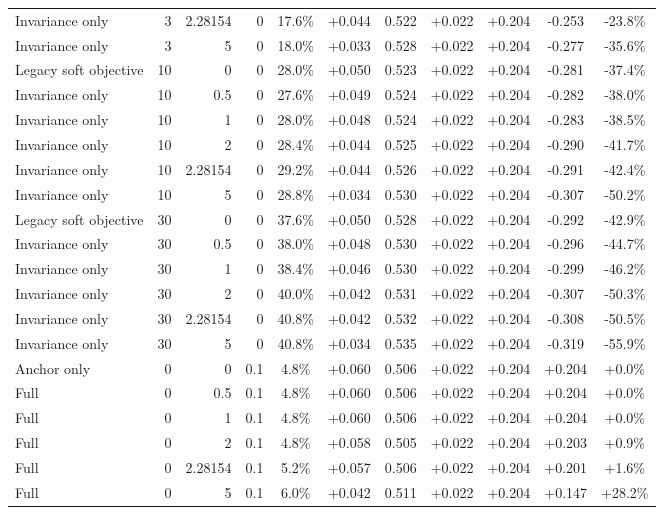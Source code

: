 \begin{table}[htbp]
\begin{tabular}{lrrrccccccc}
Invariance only & 3 & 2.28154 & 0 & 17.6\% & +0.044 & 0.522 & +0.022 & +0.204 & -0.253 & -23.8\% \\
Invariance only & 3 & 5 & 0 & 18.0\% & +0.033 & 0.528 & +0.022 & +0.204 & -0.277 & -35.6\% \\
Legacy soft objective & 10 & 0 & 0 & 28.0\% & +0.050 & 0.523 & +0.022 & +0.204 & -0.281 & -37.4\% \\
Invariance only & 10 & 0.5 & 0 & 27.6\% & +0.049 & 0.524 & +0.022 & +0.204 & -0.282 & -38.0\% \\
Invariance only & 10 & 1 & 0 & 28.0\% & +0.048 & 0.524 & +0.022 & +0.204 & -0.283 & -38.5\% \\
Invariance only & 10 & 2 & 0 & 28.4\% & +0.044 & 0.525 & +0.022 & +0.204 & -0.290 & -41.7\% \\
Invariance only & 10 & 2.28154 & 0 & 29.2\% & +0.044 & 0.526 & +0.022 & +0.204 & -0.291 & -42.4\% \\
Invariance only & 10 & 5 & 0 & 28.8\% & +0.034 & 0.530 & +0.022 & +0.204 & -0.307 & -50.2\% \\
Legacy soft objective & 30 & 0 & 0 & 37.6\% & +0.050 & 0.528 & +0.022 & +0.204 & -0.292 & -42.9\% \\
Invariance only & 30 & 0.5 & 0 & 38.0\% & +0.048 & 0.530 & +0.022 & +0.204 & -0.296 & -44.7\% \\
Invariance only & 30 & 1 & 0 & 38.4\% & +0.046 & 0.530 & +0.022 & +0.204 & -0.299 & -46.2\% \\
Invariance only & 30 & 2 & 0 & 40.0\% & +0.042 & 0.531 & +0.022 & +0.204 & -0.307 & -50.3\% \\
Invariance only & 30 & 2.28154 & 0 & 40.8\% & +0.042 & 0.532 & +0.022 & +0.204 & -0.308 & -50.5\% \\
Invariance only & 30 & 5 & 0 & 40.8\% & +0.034 & 0.535 & +0.022 & +0.204 & -0.319 & -55.9\% \\
Anchor only & 0 & 0 & 0.1 & 4.8\% & +0.060 & 0.506 & +0.022 & +0.204 & +0.204 & +0.0\% \\
Full & 0 & 0.5 & 0.1 & 4.8\% & +0.060 & 0.506 & +0.022 & +0.204 & +0.204 & +0.0\% \\
Full & 0 & 1 & 0.1 & 4.8\% & +0.060 & 0.506 & +0.022 & +0.204 & +0.204 & +0.0\% \\
Full & 0 & 2 & 0.1 & 4.8\% & +0.058 & 0.505 & +0.022 & +0.204 & +0.203 & +0.9\% \\
Full & 0 & 2.28154 & 0.1 & 5.2\% & +0.057 & 0.506 & +0.022 & +0.204 & +0.201 & +1.6\% \\
Full & 0 & 5 & 0.1 & 6.0\% & +0.042 & 0.511 & +0.022 & +0.204 & +0.147 & +28.2\% \\

\end{tabular}
\end{table}
